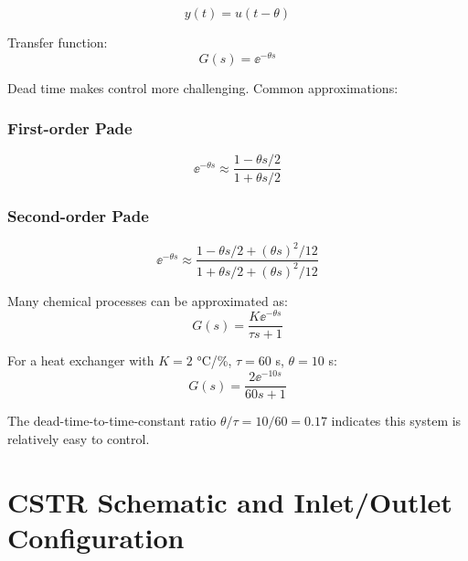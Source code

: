 \begin{equation}
y(t) = u(t - \theta)
\end{equation}

Transfer function:
\begin{equation}
G(s) = \ee^{-\theta s}
\end{equation}

Dead time makes control more challenging. Common approximations:

\subsubsection{First-order Pade}
\begin{equation}
\ee^{-\theta s} \approx \frac{1 - \theta s/2}{1 + \theta s/2}
\end{equation}

\subsubsection{Second-order Pade}
\begin{equation}
\ee^{-\theta s} \approx \frac{1 - \theta s/2 + (\theta s)^2/12}{1 + \theta s/2 + (\theta s)^2/12}
\end{equation}

\begin{examplebox}[title=Example 1.13: First-Order Plus Dead Time (FOPDT)]
Many chemical processes can be approximated as:
\begin{equation}
G(s) = \frac{K\ee^{-\theta s}}{\tau s + 1}
\end{equation}

For a heat exchanger with $K = 2$ °C/\%, $\tau = 60$ s, $\theta = 10$ s:
\begin{equation}
G(s) = \frac{2\ee^{-10s}}{60s + 1}
\end{equation}

The dead-time-to-time-constant ratio $\theta/\tau = 10/60 = 0.17$ indicates this system is relatively easy to control.
\end{examplebox}

\section{CSTR Schematic and Inlet/Outlet Configuration}
\label{sec:cstr_schematic_detailed}

